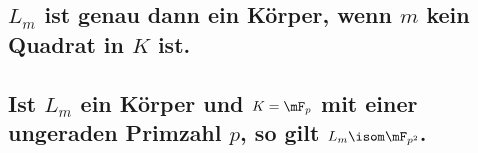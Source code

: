 \subsection{$L_m$ ist genau dann ein Körper, wenn $m$ kein Quadrat in $K$ ist.}


\subsection{Ist $L_m$ ein Körper und $K=\mF_p$ mit einer ungeraden Primzahl $p$, so gilt $L_m \isom \mF_{p^2}$.}
